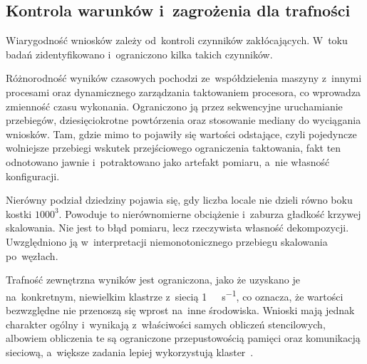 \subsection{Kontrola warunków i~zagrożenia dla trafności}

Wiarygodność wniosków zależy od~kontroli czynników zakłócających. W~toku badań zidentyfikowano
i~ograniczono kilka takich czynników.

Różnorodność wyników czasowych pochodzi ze~współdzielenia maszyny z~innymi procesami oraz dynamicznego
zarządzania taktowaniem procesora, co wprowadza zmienność czasu wykonania. Ograniczono ją przez
sekwencyjne uruchamianie przebiegów, dziesięciokrotne powtórzenia oraz stosowanie mediany do wyciągania wniosków. Tam,
gdzie mimo to pojawiły się wartości odstające, czyli pojedyncze wolniejsze przebiegi wskutek przejściowego
ograniczenia taktowania, fakt ten odnotowano jawnie i~potraktowano jako artefakt pomiaru, a~nie
własność konfiguracji.

Nierówny podział dziedziny pojawia się, gdy liczba locale nie dzieli równo boku kostki $1000^3$.
Powoduje to nierównomierne obciążenie i~zaburza gładkość krzywej skalowania. Nie jest to
błąd pomiaru, lecz rzeczywista własność dekompozycji. Uwzględniono ją w~interpretacji
niemonotonicznego przebiegu skalowania po~węzłach.

Trafność zewnętrzna wyników jest ograniczona, jako że uzyskano je na~konkretnym, niewielkim klastrze z~siecią
\SI{1}{\giga\bit\per\second}, co oznacza, że wartości bezwzględne nie przenoszą się wprost na~inne środowiska. Wnioski mają
jednak charakter ogólny i~wynikają z~właściwości samych obliczeń stencilowych, albowiem
obliczenia te są ograniczone przepustowością pamięci oraz komunikacją sieciową, a~większe
zadania lepiej wykorzystują klaster~\cite{roofline,datta-stencil}.
